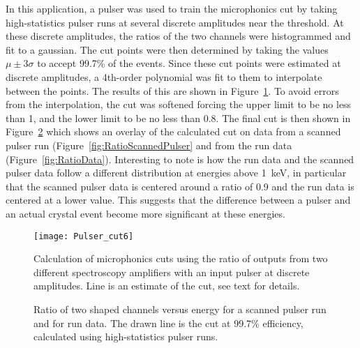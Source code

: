 	In this application, a pulser was used to train the microphonics cut by taking high-statistics pulser runs at several discrete amplitudes near the threshold.  At these discrete amplitudes, the ratios of the two channels were histogrammed and fit to a gaussian.  The cut points were then determined by taking the values $\mu \pm 3 \sigma$ to accept 99.7\% of the events.  Since these cut points were estimated at discrete amplitudes, a 4th-order polynomial was fit to them to interpolate between the points.  The results of this are shown in Figure~\ref{fig:RatioOfShapedChannels}.  To avoid errors from the interpolation, the cut was softened forcing the upper limit to be no less than 1, and the lower limit to be no less than 0.8.  The final cut is then shown in Figure~\ref{fig:RatioOfShapedChannelsFinal} which shows an overlay of the calculated cut on data from a scanned pulser run (Figure~\ref{fig:RatioScannedPulser} and from the run data (Figure~\ref{fig:RatioData}).  Interesting to note is how the run data and the scanned pulser data follow a different distribution at energies above 1~keV, in particular that the scanned pulser data is centered around a ratio of 0.9 and the run data is centered at a lower value.  This suggests that the difference between a pulser and an actual crystal event become more significant at these energies.

			\begin{figure}
				\centering
				\texttt{[image: Pulser\_cut6]}
				\caption[Calculation of microphonics cuts]
				{Calculation of microphonics cuts using the ratio of outputs from two different spectroscopy amplifiers with an input pulser at discrete amplitudes.  Line is 
				an estimate of the cut, see text for details.}
				\label{fig:RatioOfShapedChannels}
			\end{figure}

			\begin{figure}
				\centering
				\caption[Microphonics cuts on data and scanned pulser runs]
				{Ratio of two shaped channels versus energy for a scanned pulser run and for run data.  The drawn line is the cut at 99.7\% efficiency, calculated using
				high-statistics pulser runs.}
				\label{fig:RatioOfShapedChannelsFinal}
			\end{figure}
	
